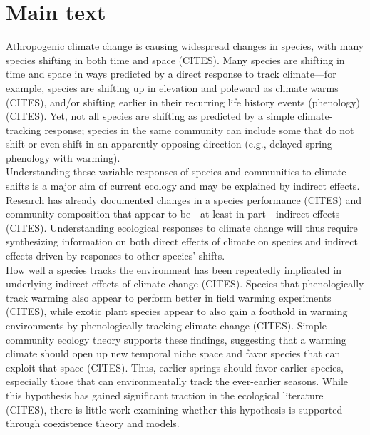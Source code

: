 \documentclass[11pt,letterpaper]{article}
\begin{document}
\section{Main text}
Athropogenic climate change is causing widespread changes in species, with many species shifting in both time and space (CITES). Many species are shifting in time and space in ways predicted by a direct response to track climate---for example, species are shifting up in elevation and poleward as climate warms (CITES), and/or shifting earlier in their recurring life history events (phenology)(CITES). Yet, not all species are shifting as predicted by a simple climate-tracking response; species in the same community can include some that do not shift or even shift in an apparently opposing direction (e.g., delayed spring phenology with warming). \\

Understanding these variable responses of species and communities to climate shifts is a major aim of current ecology and may be explained by indirect effects. Research has already documented changes in a species performance (CITES) and community composition that appear to be---at least in part---indirect effects (CITES).  Understanding ecological responses to climate change will thus require synthesizing information on both direct effects of climate on species and indirect effects driven by responses to other species' shifts. \\ %

How well a species tracks the environment has been repeatedly implicated in underlying indirect effects of climate change (CITES). Species that phenologically track warming also appear to perform better in field warming experiments (CITES), while exotic plant species appear to also gain a foothold in warming environments by phenologically tracking climate change (CITES). Simple community ecology theory supports these findings, suggesting that a warming climate should open up new temporal niche space and favor species that can exploit that space (CITES). Thus, earlier springs should favor earlier species, especially those that can environmentally track the ever-earlier seasons. While this hypothesis has gained significant traction in the ecological literature (CITES), there is little work examining whether this hypothesis is supported through coexistence theory and models. \\
\end{document}
